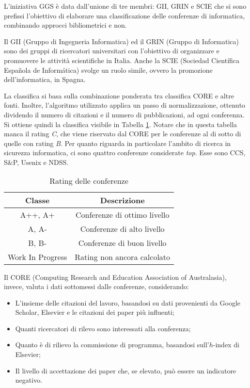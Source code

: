L'iniziativa GGS è data dall'unione di tre membri: GII, GRIN e SCIE che si sono prefissi l'obiettivo di elaborare una classificazione delle conferenze di informatica, combinando approcci bibliometrici e non.

Il GII (Gruppo di Ingegneria Informatica) \cite{gii} ed il GRIN (Gruppo di Informatica) \cite{grin} sono dei gruppi di ricercatori universitari con l'obiettivo di organizzare e promuovere le attività scientifiche in Italia. Anche la SCIE (Sociedad Científica Española de Informática) svolge un ruolo simile, ovvero la promozione dell'informatica, in Spagna.

La classifica \cite{ggsRatingPdf} si basa sulla combinazione ponderata tra classifica CORE e altre fonti. Inoltre, l'algoritmo utilizzato applica un passo di normalizzazione, ottenuto dividendo il numero di citazioni e il numero di pubblicazioni, ad ogni conferenza.
Si ottiene quindi la classifica visibile in Tabella \ref{table:ratings}.
Notare che in questa tabella manca il rating \textit{C}, che viene riservato
dal CORE per le conferenze al di sotto di quelle con rating \textit{B}.
Per quanto riguarda in particolare l'ambito di ricerca in sicurezza informatica,
ci sono quattro conferenze considerate \textit{top}. Esse sono CCS, S\&P, Usenix
e NDSS.

\begin{table}
    \centering
    \begin{tabular}{||c c ||} 
     \hline
     Classe & Descrizione \\ [0.5ex] 
     \hline\hline
     A++, A+ & Conferenze di ottimo livello \\ 
     \hline
     A, A- & Conferenze di alto livello \\
     \hline
     B, B- & Conferenze di buon livello \\
     \hline
     Work In Progress & Rating non ancora calcolato \\
     \hline
    \end{tabular}
    \caption{Rating delle conferenze}
    \label{table:ratings}
\end{table}

Il CORE (Computing Research and Education Association of Australasia), invece, valuta i dati sottomessi dalle conferenze, considerando:
\begin{itemize}
    \item L'insieme delle citazioni del lavoro, basandosi su dati provenienti da Google Scholar, Elsevier e le citazioni dei paper più influenti; 
    \item Quanti ricercatori di rilevo sono interessati alla conferenza;
    \item Quanto è di rilievo la commissione di programma, basandosi sull'$h$-index di Elsevier;
    \item Il livello di accettazione dei paper che, se elevato, può essere un indicatore negativo.
\end{itemize}

